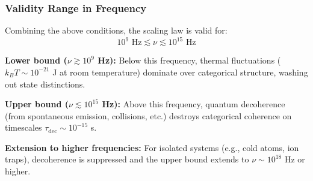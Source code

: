 \documentclass[twocolumn,10pt]{article}
\theoremstyle{remark}
\begin{document}
\subsubsection{Validity Range in Frequency}

Combining the above conditions, the scaling law is valid for:
\begin{equation}
    10^{9} \text{ Hz} \lesssim \nu \lesssim 10^{15} \text{ Hz}
    \label{eq:validity_range}
\end{equation}

\textbf{Lower bound ($\nu \gtrsim 10^9$ Hz):} Below this frequency, thermal fluctuations ($k_B T \sim 10^{-21}$ J at room temperature) dominate over categorical structure, washing out state distinctions.

\textbf{Upper bound ($\nu \lesssim 10^{15}$ Hz):} Above this frequency, quantum decoherence (from spontaneous emission, collisions, etc.) destroys categorical coherence on timescales $\tau_{\text{dec}} \sim 10^{-15}$ s.

\textbf{Extension to higher frequencies:} For isolated systems (e.g., cold atoms, ion traps), decoherence is suppressed and the upper bound extends to $\nu \sim 10^{18}$ Hz or higher.
\end{document}
